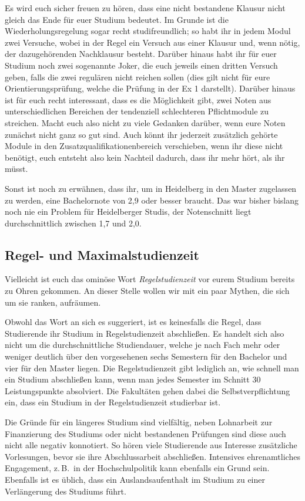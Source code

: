 Es wird euch sicher freuen zu hören, dass eine nicht bestandene Klausur nicht gleich das Ende für euer Studium bedeutet. Im Grunde ist die Wiederholungsregelung sogar recht studifreundlich; so habt ihr in jedem Modul zwei Versuche, wobei in der Regel ein Versuch aus einer Klausur und, wenn nötig, der dazugehörenden Nachklausur besteht. Darüber hinaus habt ihr für euer Studium noch zwei sogenannte Joker, die euch jeweils einen dritten Versuch geben, falls die zwei regulären nicht reichen sollen (dies gilt nicht für eure Orientierungsprüfung, welche die Prüfung in der \gls{Ex} 1 darstellt). Darüber hinaus ist für euch recht interessant, dass es die Möglichkeit gibt, zwei Noten aus unterschiedlichen Bereichen der tendenziell schlechteren Pflichtmodule zu streichen. Macht euch also nicht zu viele Gedanken darüber, wenn eure Noten zunächst nicht ganz so gut sind. Auch könnt ihr jederzeit zusätzlich gehörte Module in den Zusatzqualifikationenbereich verschieben, wenn ihr diese nicht benötigt, euch entsteht also kein Nachteil dadurch, dass ihr mehr hört, als ihr müsst.

Sonst ist noch zu erwähnen, dass ihr, um in Heidelberg in den Master zugelassen zu werden, eine Bachelornote von 2,9 oder besser braucht. Das war bisher bislang noch nie ein Problem für Heidelberger Studis, der Notenschnitt liegt durchschnittlich zwischen 1,7 und 2,0.

\subsection{Regel- und Maximalstudienzeit}

Vielleicht ist euch das ominöse Wort \emph{Regelstudienzeit} vor eurem Studium bereits zu Ohren gekommen. An dieser Stelle wollen wir mit ein paar Mythen, die sich um sie ranken, aufräumen.

Obwohl das Wort an sich es suggeriert, ist es keinesfalls die Regel, dass Studierende ihr Studium in Regelstudienzeit abschließen. Es handelt sich also nicht um die durchschnittliche Studiendauer, welche je nach Fach mehr oder weniger deutlich über den vorgesehenen sechs Semestern für den Bachelor und vier für den Master liegen. Die Regelstudienzeit gibt lediglich an, wie schnell man ein Studium abschließen kann, wenn man jedes Semester im Schnitt 30 Leistungspunkte absolviert. Die Fakultäten gehen dabei die Selbstverpflichtung ein, dass ein Studium in der Regelstudienzeit studierbar ist.

Die Gründe für ein längeres Studium sind vielfältig, neben Lohnarbeit zur Finanzierung des Studiums oder nicht bestandenen Prüfungen sind diese auch nicht alle negativ konnotiert. So hören viele Studierende aus Interesse zusätzliche Vorlesungen, bevor sie ihre Abschlussarbeit abschließen. Intensives ehrenamtliches Engagement, z.\,B.~in der Hochschulpolitik kann ebenfalls ein Grund sein. Ebenfalls ist es üblich, dass ein Auslandsaufenthalt im Studium zu einer Verlängerung des Studiums führt. 

